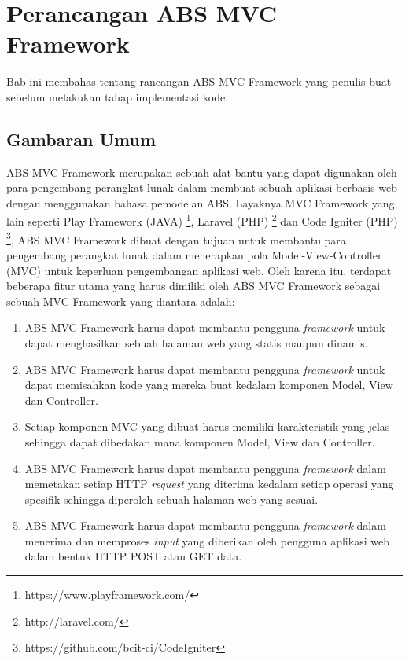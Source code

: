 \chapter{Perancangan ABS MVC Framework}

Bab ini membahas tentang rancangan ABS MVC Framework yang penulis buat sebelum melakukan tahap implementasi kode.

\section{Gambaran Umum}

ABS MVC Framework merupakan sebuah alat bantu yang dapat digunakan oleh para pengembang perangkat lunak dalam membuat sebuah aplikasi berbasis web dengan menggunakan bahasa pemodelan ABS. Layaknya MVC Framework yang lain seperti Play Framework (JAVA) \footnote{https://www.playframework.com/}, Laravel (PHP) \footnote{http://laravel.com/} dan Code Igniter (PHP) \footnote{https://github.com/bcit-ci/CodeIgniter}, ABS MVC Framework dibuat dengan tujuan untuk membantu para pengembang perangkat lunak dalam menerapkan pola Model-View-Controller (MVC) untuk keperluan pengembangan aplikasi web. Oleh karena itu, terdapat beberapa fitur utama yang harus dimiliki oleh ABS MVC Framework sebagai sebuah MVC Framework yang diantara adalah:

\begin{enumerate}
    \item ABS MVC Framework harus dapat membantu pengguna \textit{framework} untuk dapat menghasilkan sebuah halaman web yang statis maupun dinamis.
    \item ABS MVC Framework harus dapat membantu pengguna \textit{framework} untuk dapat memisahkan kode yang mereka buat kedalam komponen Model, View dan Controller.
    \item Setiap komponen MVC yang dibuat harus memiliki karakteristik yang jelas sehingga dapat dibedakan mana komponen Model, View dan Controller.
    \item ABS MVC Framework harus dapat membantu pengguna \textit{framework} dalam memetakan setiap HTTP \textit{request} yang diterima kedalam setiap operasi yang spesifik sehingga diperoleh sebuah halaman web yang sesuai.
    \item ABS MVC Framework harus dapat membantu pengguna \textit{framework} dalam menerima dan memproses \textit{input} yang diberikan oleh pengguna aplikasi web dalam bentuk HTTP POST atau GET data. 
\end{enumerate}


